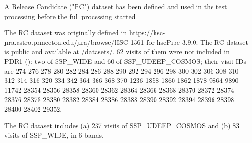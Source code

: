 \documentclass[DM,authoryear,toc]{lsstdoc}
\begin{document}
A Release Candidate ("RC") dataset has been defined and used in the test processing before the full processing started.

The RC dataset was originally defined in https://hsc-jira.astro.princeton.edu/jira/browse/HSC-1361 for hscPipe 3.9.0.
The RC dataset is public and available at /datasets/. 62 visits of them were not included in PDR1 (): two of SSP{\_}WIDE and 60 of SSP{\_}UDEEP{\_}COSMOS; their visit IDs are 274 276 278 280 282 284 286 288 290 292 294 296 298 300 302 306 308 310 312 314 316 320 334 342 364 366 368 370 1236 1858 1860 1862 1878 9864 9890 11742 28354 28356 28358 28360 28362 28364 28366 28368 28370 28372 28374 28376 28378 28380 28382 28384 28386 28388 28390 28392 28394 28396 28398 28400 28402 29352.

The RC dataset includes (a) 237 visits of SSP{\_}UDEEP{\_}COSMOS and (b) 83 visits of SSP{\_}WIDE, in 6 bands.
\end{document}
